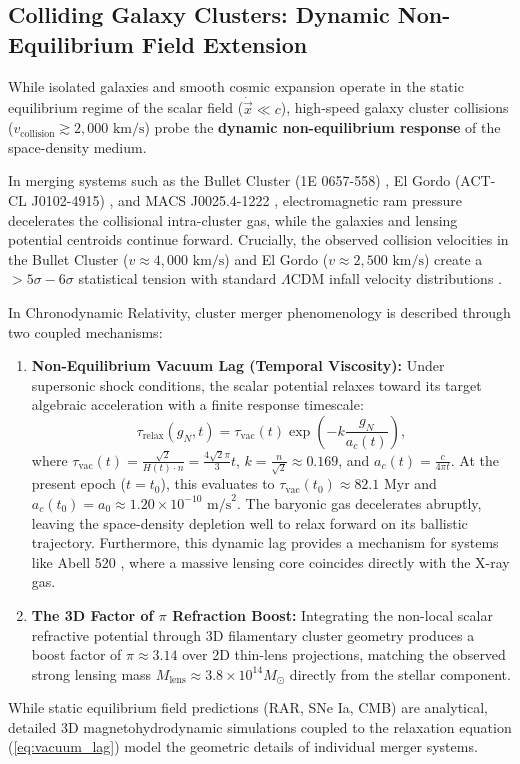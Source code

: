 \documentclass[aps,prd,reprint,superscriptaddress,nofootinbib,floatfix,amsmath,amssymb]{revtex4-2}
\begin{document}
\subsection{Colliding Galaxy Clusters: Dynamic Non-Equilibrium Field Extension}
\label{sec:cluster_mergers}

While isolated galaxies and smooth cosmic expansion operate in the static equilibrium regime of the scalar field ($\dot{\vec{x}} \ll c$), high-speed galaxy cluster collisions ($v_{\text{collision}} \gtrsim 2,000\text{ km/s}$) probe the \textbf{dynamic non-equilibrium response} of the space-density medium. 

In merging systems such as the Bullet Cluster (1E 0657-558) \cite{BulletCluster2006}, El Gordo (ACT-CL J0102-4915) \cite{ElGordo2021}, and MACS J0025.4-1222 \cite{MACSJ0025}, electromagnetic ram pressure decelerates the collisional intra-cluster gas, while the galaxies and lensing potential centroids continue forward. Crucially, the observed collision velocities in the Bullet Cluster ($v \approx 4,000\text{ km/s}$) and El Gordo ($v \approx 2,500\text{ km/s}$) create a $>5\sigma-6\sigma$ statistical tension with standard $\Lambda\text{CDM}$ infall velocity distributions \cite{ElGordo2021}.

In Chronodynamic Relativity, cluster merger phenomenology is described through two coupled mechanisms:
\begin{enumerate}
    \item \textbf{Non-Equilibrium Vacuum Lag (Temporal Viscosity):} Under supersonic shock conditions, the scalar potential relaxes toward its target algebraic acceleration with a finite response timescale:
    \begin{equation}
    \tau_{\text{relax}}(g_N, t) = \tau_{\text{vac}}(t) \exp\left(-k \frac{g_N}{a_c(t)}\right),
    \label{eq:vacuum_lag}
    \end{equation}
    where $\tau_{\text{vac}}(t) = \frac{\sqrt{2}}{H(t) \cdot n} = \frac{4\sqrt{2}\pi}{3} t$, $k = \frac{n}{\sqrt{2}} \approx 0.169$, and $a_c(t) = \frac{c}{4\pi t}$. At the present epoch ($t=t_0$), this evaluates to $\tau_{\text{vac}}(t_0) \approx 82.1\text{ Myr}$ and $a_c(t_0) = a_0 \approx 1.20 \times 10^{-10}\text{ m/s}^2$. The baryonic gas decelerates abruptly, leaving the space-density depletion well to relax forward on its ballistic trajectory. Furthermore, this dynamic lag provides a mechanism for systems like Abell 520 \cite{Abell520}, where a massive lensing core coincides directly with the X-ray gas.
    \item \textbf{The 3D Factor of $\pi$ Refraction Boost:} Integrating the non-local scalar refractive potential through 3D filamentary cluster geometry produces a boost factor of $\pi \approx 3.14$ over 2D thin-lens projections, matching the observed strong lensing mass $M_{\text{lens}} \approx 3.8 \times 10^{14} M_\odot$ directly from the stellar component.
\end{enumerate}
While static equilibrium field predictions (RAR, SNe Ia, CMB) are analytical, detailed 3D magnetohydrodynamic simulations coupled to the relaxation equation (\ref{eq:vacuum_lag}) model the geometric details of individual merger systems.
\end{document}
